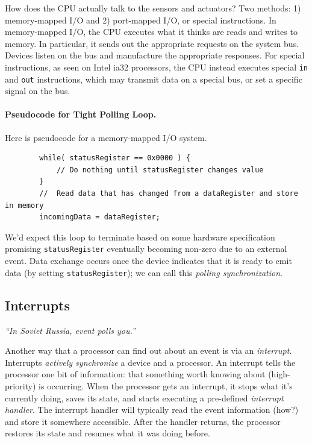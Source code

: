 How does the CPU actually talk to the sensors and actuators?  Two
methods: 1) memory-mapped I/O and 2) port-mapped I/O, or special
instructions.  In memory-mapped I/O, the CPU executes what it thinks
are reads and writes to memory. In particular, it sends out the
appropriate requests on the system bus. Devices listen on the bus and
manufacture the appropriate responses. For special instructions, as seen
on Intel ia32 processors, the CPU instead executes special {\tt in} and
{\tt out} instructions, which may transmit data on a special bus,
or set a specific signal on the bus.

\paragraph{Pseudocode for Tight Polling Loop.} 
Here is pseudocode for a memory-mapped I/O system.
\begin{verbatim}
        while( statusRegister == 0x0000 ) {
            // Do nothing until statusRegister changes value
        }
        //  Read data that has changed from a dataRegister and store in memory
        incomingData = dataRegister;
\end{verbatim}
We'd expect this loop to terminate based on some hardware specification
promising {\tt statusRegister} eventually becoming non-zero due to an
external event. Data exchange occurs once the device indicates that
it is ready to emit data (by setting {\tt statusRegister}); we can
call this \emph{polling synchronization}.


\subsection*{Interrupts}
\vspace*{-1em}
\hfill \emph{``In Soviet Russia, event polls you.''}

Another way that a processor can find out about an event is via an
\emph{interrupt}. Interrupts \emph{actively synchronize} a device and
a processor.  An interrupt tells the processor one bit of information:
that something worth knowing about (high-priority) is occurring. When
the processor gets an interrupt, it stops what it's currently doing,
saves its state, and starts executing a pre-defined \emph{interrupt
  handler}.  The interrupt handler will typically read the event
information (how?) and store it somewhere accessible.  After the handler
returns, the processor restores its state and resumes what it was
doing before.


